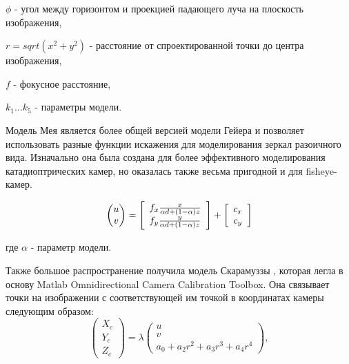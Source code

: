 \qquad $\phi$ - угол между горизонтом и проекцией падающего луча на плоскость изображения, 

\qquad $r = sqrt(x^2+y^2)$ - расстояние от спроектированной точки до центра изображения, 

\qquad $f$ - фокусное расстояние, 

\qquad $k_1 \dots k_5$ - параметры модели.

Модель Мея \cite{mei} является более общей версией модели Гейера \cite{geyer} и позволяет использовать разные 
функции искажения для моделирования зеркал разоичного вида. Изначально она была создана для более 
эффективного моделирования катадиоптрических камер, но оказалась также весьма пригодной и для fisheye-камер. 

\begin{equation}
    \vspace{12pt}
    \begin{pmatrix}u\\v\end{pmatrix}=\left[\begin{array}{l}
	f_{x} \frac{x}{\alpha d+(1-\alpha) z} \\
	f_{y} \frac{y}{\alpha d+(1-\alpha) z}
	\end{array}\right]+\left[\begin{array}{l}
	c_{x} \\
	c_{y}
	\end{array}\right]
    \vspace{12pt}
\end{equation}

где $\alpha$ - параметр модели. 

Также большое распространение получила модель Скарамуззы \cite{scaramuzza}, которая легла в основу Matlab Omnidirectional 
Camera Calibration Toolbox. Она связывает точки на изображении с соответствующей им точкой в координатах камеры
следующим образом:
\vskip 12pt
\begin{equation}	
    \begin{pmatrix}X_c\\Y_c\\Z_c\end{pmatrix} = \lambda \begin{pmatrix}u\\v\\a_0 + a_2 r^2 + a_3 r^3 + a_4 r^4\end{pmatrix},
    \label{eqn:scaramuzza} 
\end{equation}
\vskip 24pt

